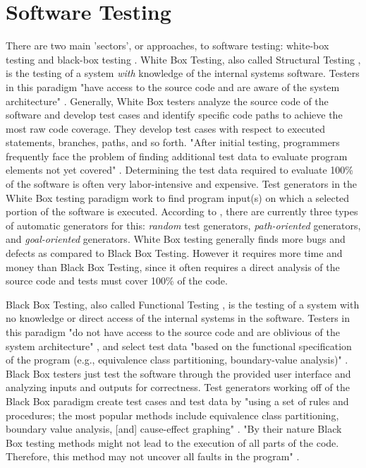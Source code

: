 \documentclass[10pt, final, journal, letterpaper, twoside, twocolumn]{IEEEtran}
\begin{document}
\section{\label{sec:software}Software Testing}
	There are two main 'sectors', or approaches, to software testing: white-box testing and black-box testing \cite{boxes}. White Box Testing, also called Structural Testing \cite{slide-testing}, is the testing of a system \textit{with} knowledge of the internal systems software. Testers in this paradigm "have access to the source code and are aware of the system architecture" \cite{boxes}. Generally, White Box testers analyze the source code of the software and develop test cases and identify specific code paths to achieve the most raw code coverage. They develop test cases with respect to executed statements, branches, paths, and so forth. "After initial testing, programmers frequently face the problem of finding additional test data to evaluate program elements not yet covered" \cite{assertion}. Determining the test data required to evaluate 100\% of the software is often very labor-intensive and expensive. Test generators in the White Box testing paradigm work to find program input(s) on which a selected portion of the software is executed. According to \cite{assertion}, there are currently three types of automatic generators for this: \textit{random} test generators, \textit{path-oriented} generators, and \textit{goal-oriented} generators. White Box testing generally finds more bugs and defects as compared to Black Box Testing. However it requires more time and money than Black Box Testing, since it often requires a direct analysis of the source code and tests must cover 100\% of the code.
	
	Black Box Testing, also called Functional Testing \cite{slide-testing}, is the testing of a system with no knowledge or direct access of the internal systems in the software. Testers in this paradigm "do not have access to the source code and are oblivious of the system architecture" \cite{boxes}, and select test data "based on the functional specification of the program (e.g., equivalence class partitioning, boundary-value analysis)" \cite{assertion}. Black Box testers just test the software through the provided user interface and analyzing inputs and outputs for correctness. Test generators working off of the Black Box paradigm create test cases and test data by "using a set of rules and procedures; the most popular methods include equivalence class partitioning, boundary value analysis, [and] cause-effect graphing" \cite{assertion}. "By their nature Black Box testing methods might not lead to the execution of all parts of the code. Therefore, this method may not uncover all faults in the program" \cite{fuzzy-logic}. 
	
\end{document}
